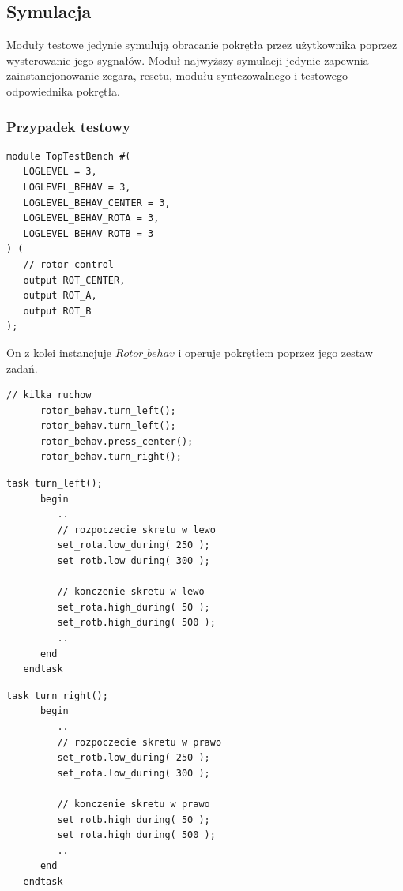 \documentclass[a4paper,12pt]{article}
\begin{document}
\subsection{Symulacja}
Moduły testowe jedynie symulują obracanie pokrętła przez użytkownika poprzez wysterowanie jego sygnałów. Moduł najwyższy symulacji jedynie zapewnia zainstancjonowanie zegara, resetu, modułu syntezowalnego i testowego odpowiednika pokrętła.

\subsubsection{Przypadek testowy}


\begin{lstlisting}[label=TopTestBench,caption=TopTestBench.v]
module TopTestBench #(
   LOGLEVEL = 3,
   LOGLEVEL_BEHAV = 3,
   LOGLEVEL_BEHAV_CENTER = 3,
   LOGLEVEL_BEHAV_ROTA = 3,
   LOGLEVEL_BEHAV_ROTB = 3
) (
   // rotor control
   output ROT_CENTER,
   output ROT_A,
   output ROT_B
);
\end{lstlisting}
On z kolei instancjuje $Rotor\_behav$ i operuje pokrętłem poprzez jego zestaw zadań.
\begin{lstlisting}[label=TopTestBench,caption=TopTestBench.v,firstnumber=37]
      // kilka ruchow
      rotor_behav.turn_left();
      rotor_behav.turn_left();
      rotor_behav.press_center();
      rotor_behav.turn_right();
\end{lstlisting}

\begin{lstlisting}[label=Rotor_behav,caption=Rotor\_behav.v]
   task turn_left();
      begin
         ..
         // rozpoczecie skretu w lewo
         set_rota.low_during( 250 );
         set_rotb.low_during( 300 );

         // konczenie skretu w lewo
         set_rota.high_during( 50 );
         set_rotb.high_during( 500 );
         ..
      end
   endtask
\end{lstlisting}


\begin{lstlisting}[label=Rotor_behav,caption=Rotor\_behav.v]
   task turn_right();
      begin
         ..
         // rozpoczecie skretu w prawo
         set_rotb.low_during( 250 );
         set_rota.low_during( 300 );

         // konczenie skretu w prawo
         set_rotb.high_during( 50 );
         set_rota.high_during( 500 );
         ..
      end
   endtask
\end{lstlisting}
\end{document}

